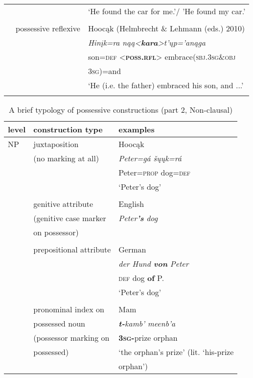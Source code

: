 \documentclass[output=paper]{LSP/langsci}
\begin{document}
\begin{table}
\begin{tabular}[h!]{l l l }
& & `He found the car for me.'/ 'He found my car.' \\
& \\
& possessive reflexive & Hooc\k{a}k (Helmbrecht \& Lehmann (eds.) 2010) \\
& & \textit{Hinįk=ra n\k{a}\k{a}<\textbf{kara}>t’ųp='an\k{a}ga} \\
& & son=\textsc{def} <\textbf{\textsc{poss.rfl}}> embrace(\textsc{sbj.3sg}\&\textsc{obj} \\
& & \textsc{3sg})=and \\
& &  `He (i.e. the father) embraced his son, and ...'\\
\lspbottomrule
\end{tabular}
\end{table} 

\begin{table}
\caption{A brief typology of possessive constructions (part 2, Non-clausal)} \label{typology2}
\begin{tabular}[h!]{l l l }
\lsptoprule
level & construction type & examples \\
\midrule
NP  & juxtaposition & Hooc\k{a}k \citep[13]{Helmbrecht2003}  \\
& (no marking at all) & \textit{Peter=gá        šųųk=rá} \\
&  & Peter=\textsc{prop}  dog=\textsc{def} \\
& & `Peter's dog' \\
& \\
& genitive attribute & English \\
& (genitive case marker & \textit{Peter\textbf{'s} dog} \\
&  on possessor) & \\
& \\
& prepositional attribute & German \\
& & \textit{der Hund \textbf{von} Peter} \\
& & \textsc{def} dog    \textbf{of}   P. \\
& & `Peter's dog' \\
& \\
 & pronominal index on  & Mam \citep[142]{England1983} \\
& possessed noun & \textit{\textbf{t-}kamb'    meenb'a} \\
& (possessor marking on & \textbf{\textsc{3sg}-}prize orphan \\
& possessed) & `the orphan's prize' (lit. `his-prize  \\
& & orphan') \\

\end{tabular}
\end{table}
\end{document}
